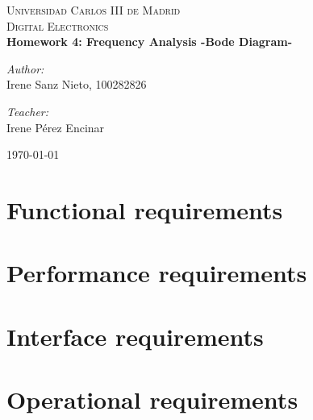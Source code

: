 \documentclass{article}
\begin{document}
\begin{titlepage}

\begin{center}
\textsc{\LARGE Universidad Carlos III de Madrid}\\[0.5cm]
\textsc{\Large Digital Electronics}\\[4cm]


{\huge \bfseries{Homework 4: Frequency Analysis -Bode Diagram-}\\[8cm]}


\begin{minipage}{0.55\textwidth}
\begin{flushleft} \large
\emph{Author:}\\
Irene Sanz Nieto, 100282826\\
\end{flushleft}
\end{minipage}
\begin{minipage}{0.4\textwidth}
\begin{flushright} \large
\emph{Teacher:}\\
Irene Pérez Encinar
\end{flushright}\end{minipage}\vfill

{\large \today}

\end{center}
\end{titlepage}

%
\newpage
%
\tableofcontents
\newpage

\section{Functional requirements}
\section{Performance requirements}
\section{Interface requirements}
\section{Operational requirements}
\end{document}
